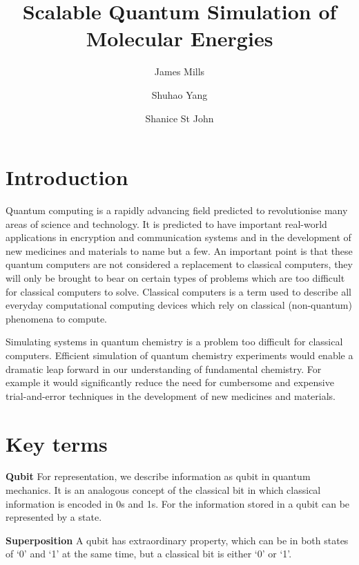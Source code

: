 \documentclass[14pt,landscape,color=UCLdarkred,margin=3cm]{uclposter}
\title{Scalable Quantum Simulation of Molecular Energies}
\author{James Mills}
\author{Shuhao Yang}
\author{Shanice St John}
\affil[1]{MSc Quantum Technologies, UCL}
\begin{document}
\large

\maketitle

\begin{multicols}{3}

\section*{Introduction}


Quantum computing is a rapidly advancing field predicted to revolutionise many
areas of science and technology. It is predicted to have important real-world applications in encryption and communication systems and in the development of new medicines and materials to name but a few. An important point is that these quantum computers are not considered a replacement to classical computers, they will only be brought to bear on certain types of problems which are too difficult for classical computers to solve. Classical computers is a term used to describe all everyday computational computing devices which rely on classical (non-quantum) phenomena to compute.

Simulating systems in quantum chemistry is a problem too difficult for classical computers. Efficient simulation of quantum chemistry experiments would enable a dramatic leap forward in our understanding of fundamental chemistry. For example it would significantly reduce the need for cumbersome and expensive trial-and-error techniques in the development of new medicines and materials.

\section*{Key terms}


\begin{highlightbox}
	\textbf{Qubit} For representation, we describe information as qubit in quantum mechanics. It is an analogous concept of the classical bit in which classical information is encoded in 0s and 1s. For the information stored in a qubit can be represented by a state.
\end{highlightbox}

\begin{highlightbox}
  \textbf{Superposition} A qubit has extraordinary property, which can be in both states of `0' and `1' at the same time, but a classical bit is either `0' or `1'.
\end{highlightbox}




\end{multicols}
\end{document}
